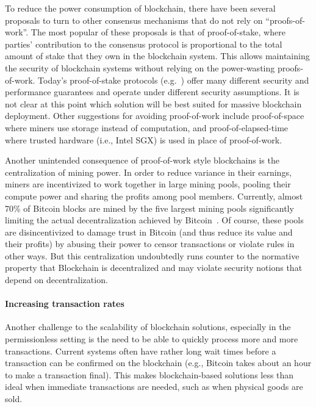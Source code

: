 To reduce the power consumption of blockchain, there have been several proposals to turn to other consensus mechanisms that do not rely on ``proofs-of-work''.  The most popular of these proposals is that of proof-of-stake, where parties' contribution to the consensus protocol is proportional to the total amount of stake that they own in the blockchain system.  This allows maintaining the security of blockchain systems without relying on the power-wasting proofs-of-work.  Today's proof-of-stake protocols (e.g.~\cite{FC:BenGabMiz16,eprint:BenPasShi16,CRYPTO:KRDO17,SOSP:GHMVZ17,eprint:FanZho17}) offer many different security and performance guarantees and operate under different security assumptions.  It is not clear at this point which solution will be best suited for massive blockchain deployment.  Other suggestions for avoiding proof-of-work include proof-of-space~\cite{CRYPTO:DFKP15, eprint:PPKAFG15} where miners use storage instead of computation, and proof-of-elapsed-time~\cite{SSS:CXSGLS17} where trusted hardware (i.e., Intel SGX) is used in place of proof-of-work.

Another unintended consequence of proof-of-work style blockchains is the centralization of mining power.  In order to reduce variance in their earnings, miners are incentivized to work together in large mining pools, pooling their compute power and sharing the profits among pool members.  Currently, almost 70\% of Bitcoin blocks are mined by the five largest mining pools \cite{BlockchainInfoPools} significantly limiting the actual decentralization achieved by Bitcoin~\cite{arxiv:GBERS18}. Of course, these pools are disincentivized to damage trust in Bitcoin (and thus reduce its value and their profits) by abusing their power to censor transactions or violate rules in other ways. But this centralization undoubtedly runs counter to the normative property that Blockchain is decentralized and may violate security notions that depend on decentralization.  

\paragraph{Increasing transaction rates}
Another challenge to the scalability of blockchain solutions, especially in the permissionless setting is the need to be able to quickly process more and more transactions.  Current systems often have rather long wait times before a transaction can be confirmed on the blockchain (e.g., Bitcoin takes about an hour to make a transaction final).  This makes blockchain-based solutions less than ideal when immediate transactions are needed, such as when physical goods are sold.

